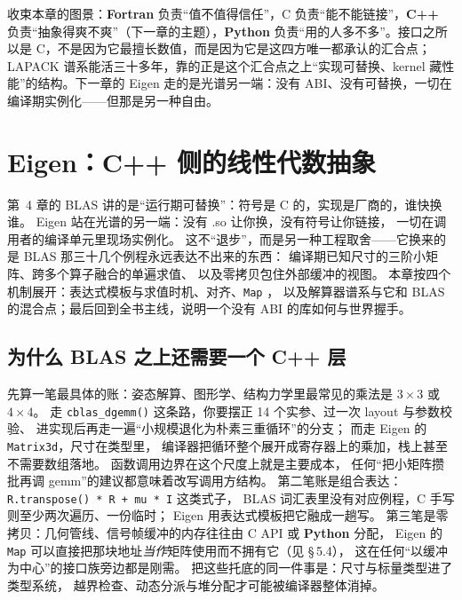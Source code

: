 \documentclass[12pt,a4paper,fontset=fandol]{ctexbook}
\newcommand{\Fn}[1]{\texttt{#1()}}
\newcommand{\Tp}[1]{\texttt{#1}}
\newcommand{\Bk}{\allowbreak}
\newcommand{\Lang}[1]{\textsf{\bfseries #1}}
\newcommand{\CPP}{\Lang{C++}}
\newcommand{\FTN}{\Lang{Fortran}}
\newcommand{\PY}{\Lang{Python}}
\begin{document}
收束本章的图景：\FTN{} 负责``值不值得信任''，C 负责``能不能链接''，\CPP{} 负责``抽象得爽不爽''（下一章的主题），\PY{} 负责``用的人多不多''。接口之所以是 C，不是因为它最擅长数值，而是因为它是这四方唯一都承认的汇合点；LAPACK 谱系能活三十多年，靠的正是这个汇合点之上``实现可替换、kernel 藏性能''的结构。下一章的 Eigen 走的是光谱另一端：没有 ABI、没有可替换，一切在编译期实例化——但那是另一种自由。


\chapter{Eigen：\CPP{} 侧的线性代数抽象}

第~4 章的 BLAS 讲的是``运行期可替换''：符号是 C 的，实现是厂商的，谁快换谁。
Eigen 站在光谱的另一端：没有 .so 让你换，没有符号让你链接，
一切在调用者的编译单元里现场实例化。
这不``退步''，而是另一种工程取舍——它换来的是 BLAS 那三十几个例程永远表达不出来的东西：
编译期已知尺寸的三阶小矩阵、跨多个算子融合的单遍求值、
以及零拷贝包住外部缓冲的视图。
本章按四个机制展开：表达式模板与求值时机、对齐、\Tp{Map} \Bk{}，
以及解算器谱系与它和 BLAS 的混合点；最后回到全书主线，说明一个没有 ABI 的库如何与世界握手。

\section{为什么 BLAS 之上还需要一个 \CPP{} 层}

先算一笔最具体的账：姿态解算、图形学、结构力学里最常见的乘法是 $3 \times 3$ 或 $4 \times 4$。
走 \Fn{cblas\_dgemm} \Bk{} 这条路，你要摆正 14 个实参、过一次 layout 与参数校验、
进实现后再走一遍``小规模退化为朴素三重循环''的分支；
而走 Eigen 的 \Tp{Matrix3d}，尺寸在类型里，
编译器把循环整个展开成寄存器上的乘加，栈上甚至不需要数组落地。
函数调用边界在这个尺度上就是主要成本，
任何``把小矩阵攒批再调 gemm''的建议都意味着改写调用方结构。
第二笔账是组合表达：\Tp{R.transpose() * R + mu * I} \Bk{} 这类式子，
BLAS 词汇表里没有对应例程，C 手写则至少两次遍历、一份临时；
Eigen 用表达式模板把它融成一趟写。
第三笔是零拷贝：几何管线、信号帧缓冲的内存往往由 C API 或 \PY{} 分配，
Eigen 的 \Tp{Map} \Bk{} 可以直接把那块地址\emph{当作}矩阵使用而不拥有它（见 \S\,5.4），
这在任何``以缓冲为中心''的接口族旁边都是刚需。
把这些托底的同一件事是：尺寸与标量类型进了类型系统，
越界检查、动态分派与堆分配才可能被编译器整体消掉。
\end{document}

